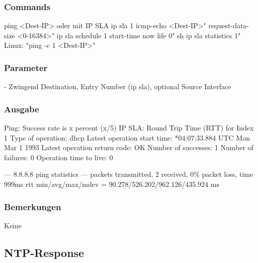 \documentclass[a4,12pt]{scrartcl}
\begin{document}
\subsubsection{Commands}
ping <Dest-IP>\newline\newline
oder mit IP SLA\newline
ip sla 1
icmp-echo <Dest-IP>"
request-data-size <0-16384>"\newline
ip sla schedule 1 start-time now life 0"\newline
sh ip sla statistics 1"\newline
{}
Linux: "ping -c 1 <Dest-IP>"
\subsubsection{Parameter}
- Zwingend Destination, Entry Number (ip sla), optional Source Interface
\subsubsection{Ausgabe}
Ping: \newline	 
Success rate is x percent (x/5)\newline
IP SLA:\newline
Round Trip Time (RTT) for Index 1\newline
Type of operation: dhcp\newline
Latest operation start time: *04:07:33.884 UTC Mon Mar 1 1993\newline
Latest operation return code: OK\newline
Number of successes: 1\newline
Number of failures: 0\newline
Operation time to live: 0\newline

--- 8.8.8.8 ping statistics --- packets transmitted, 2 received, 0\% packet loss, time 999ms\newline
rtt min/avg/max/mdev = 90.278/526.202/962.126/435.924 ms\newline

\subsubsection{Bemerkungen}
Keine

\subsection{NTP-Response}
\end{document}
